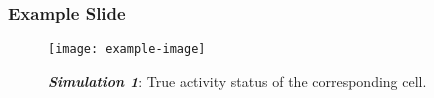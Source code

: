 \documentclass{beamer}
\begin{document}
\begin{frame}

\frametitle{Example Slide}

\begin{figure}
  \texttt{[image: example-image]}

  \textbf{\emph{Simulation 1}}: True activity status of the corresponding cell.
\end{figure}

\end{frame}
\end{document}
